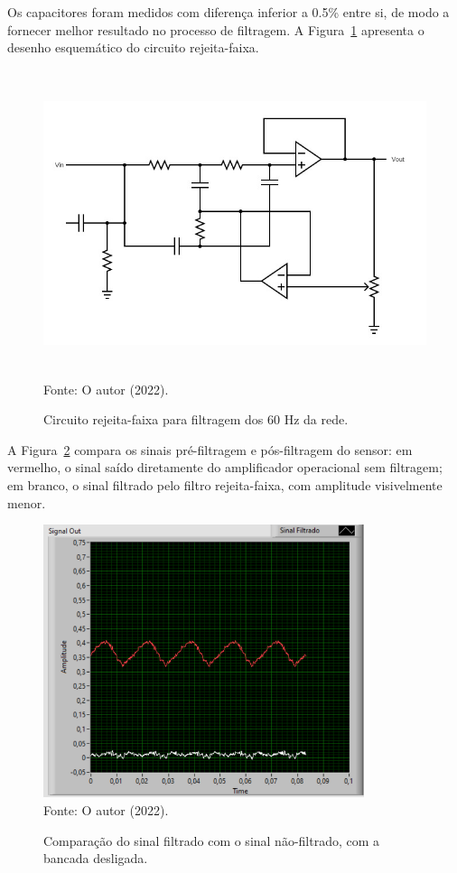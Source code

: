 \documentclass[
	12pt,				
	oneside,			
	a4paper,			
	english,			
	brazil,			
	]{abntex2ppgsi}
\begin{document}
Os capacitores foram medidos com diferença inferior a 0.5\% entre si, de modo a fornecer melhor resultado no processo de filtragem. A Figura~\ref{circuito_notch} apresenta o desenho esquemático do circuito rejeita-faixa.

\begin{figure}[H]
\centering
\caption {Circuito rejeita-faixa para filtragem dos 60 Hz da rede.}
\includegraphics[width=\textwidth,height=90mm,keepaspectratio]{circuito_notch} \\
Fonte: O autor (2022).
\label{circuito_notch}
\end{figure} 

A Figura~\ref{sinal_filtrado_maquina_desligada} compara os sinais pré-filtragem e pós-filtragem do sensor: em vermelho, o sinal saído diretamente do amplificador operacional sem filtragem; em branco, o sinal filtrado pelo filtro rejeita-faixa, com amplitude visivelmente menor.

\begin{figure}[H]
\centering
\caption {Comparação do sinal filtrado com o sinal não-filtrado, com a bancada desligada.}
\includegraphics[width=\textwidth,height=80mm,keepaspectratio]{GraficosAnalise/sinal_filtrado_maquina_desligada} \\
Fonte: O autor (2022).
\label{sinal_filtrado_maquina_desligada}
\end{figure} 
\end{document}
